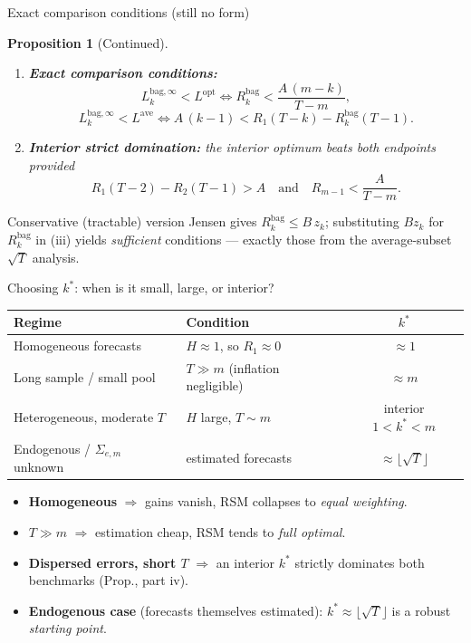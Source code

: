 \documentclass[11pt,aspectratio=169]{beamer}
\newcommand{\Sig}{\Sigma_{e,m}}
\newcommand{\Lopt}{L^{\mathrm{opt}}}
\newcommand{\Lave}{L^{\mathrm{ave}}}
\newcommand{\Lbag}{L_k^{\mathrm{bag},\infty}}
\newcommand{\Rk}{R_k^{\mathrm{bag}}}
\newtheorem{propositionX}{Proposition}
\begin{document}
\begin{frame}{Exact comparison conditions (still no form)}
  \begin{propositionX}[Continued]
    \begin{enumerate}
      \item[(iii)] \textbf{Exact comparison conditions:}
        \[
          \Lbag<\Lopt\iff \Rk<\frac{A\,(m-k)}{T-m},
        \]
        \[
          \Lbag<\Lave\iff A\,(k-1)<R_1(T-k)-\Rk(T-1).
        \]
      \item[(iv)] \textbf{Interior strict domination:} the interior optimum
        beats \emph{both} endpoints provided
        \[
          R_1(T-2)-R_2(T-1)>A
          \quad\text{and}\quad
          R_{m-1}<\frac{A}{T-m}.
        \]
    \end{enumerate}
  \end{propositionX}
  \begin{block}{Conservative (tractable) version}
    \footnotesize Jensen gives $\Rk\le B\,z_k$; substituting $B z_k$ for $\Rk$
    in (iii) yields \emph{sufficient} conditions --- exactly those from the
    average-subset $\sqrt{T}$ analysis.
  \end{block}
\end{frame}

\begin{frame}{Choosing $k^*$: when is it small, large, or interior?}
  \renewcommand{\arraystretch}{1.35}
  \begin{center}
  \begin{tabular}{@{}p{} p{} c@{}}
    \toprule
    \textbf{Regime} & \textbf{Condition} & \textbf{$k^*$} \\
    \midrule
    Homogeneous forecasts & $H\approx1$, so $R_1\approx0$ &
      $\approx 1$ \\
    Long sample / small pool & $T\gg m$ (inflation negligible) &
      $\approx m$ \\
    Heterogeneous, moderate $T$ & $H$ large, $T\sim m$ &
      interior $1<k^*<m$ \\
    Endogenous / $\Sig$ unknown & estimated forecasts &
      $\approx\lfloor\sqrt{T}\rfloor$ \\
    \bottomrule
  \end{tabular}
  \end{center}
  \begin{itemize}
    \item \textbf{Homogeneous} $\Rightarrow$ gains vanish, RSM collapses to
      \emph{equal weighting}.
    \item \textbf{$T\gg m$} $\Rightarrow$ estimation cheap, RSM tends to
      \emph{full optimal}.
    \item \textbf{Dispersed errors, short $T$} $\Rightarrow$ an interior
      $k^*$ strictly dominates both benchmarks (Prop., part iv).
    \item \textbf{Endogenous case} (forecasts themselves estimated):
      $k^*\approx\lfloor\sqrt{T}\rfloor$ is a robust \emph{starting point}.
  \end{itemize}
\end{frame}
\end{document}
